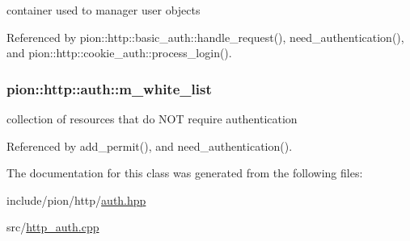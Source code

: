 container used to manager user objects 



Referenced by pion\-::http\-::basic\-\_\-auth\-::handle\-\_\-request(), need\-\_\-authentication(), and pion\-::http\-::cookie\-\_\-auth\-::process\-\_\-login().

\hypertarget{classpion_1_1http_1_1auth_a7c65c43c168549ae65ce443c10a9021a}{
\subsubsection[{m\-\_\-white\-\_\-list}]{ pion\-::http\-::auth\-::m\-\_\-white\-\_\-list\hspace{0.3cm}{\ttfamily [protected]}}}\label{classpion_1_1http_1_1auth_a7c65c43c168549ae65ce443c10a9021a}


collection of resources that do N\-O\-T require authentication 



Referenced by add\-\_\-permit(), and need\-\_\-authentication().



The documentation for this class was generated from the following files\-:\begin{DoxyCompactItemize}
\item 
include/pion/http/\hyperlink{auth_8hpp}{auth.\-hpp}\item 
src/\hyperlink{http__auth_8cpp}{http\-\_\-auth.\-cpp}\end{DoxyCompactItemize}
